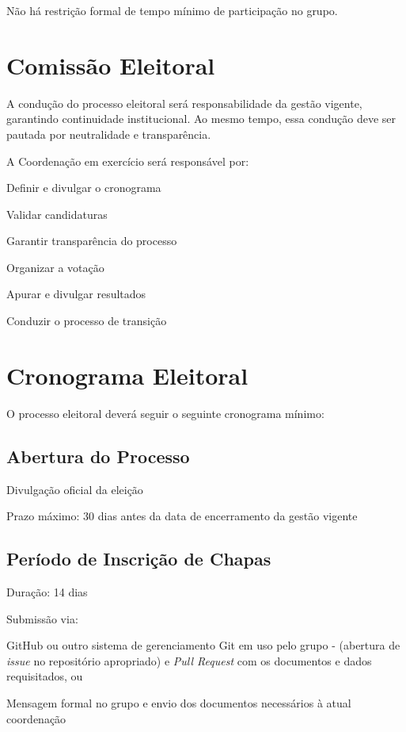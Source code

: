\documentclass[
  12pt,          %
  a4paper,       %
  oneside,       %
  brazil         %
]{article}
\begin{document}
Não há restrição formal de tempo mínimo de participação no grupo.

\section{Comissão Eleitoral}

A condução do processo eleitoral será responsabilidade da gestão vigente, garantindo continuidade institucional. 
Ao mesmo tempo, essa condução deve ser pautada por neutralidade e transparência.

A Coordenação em exercício será responsável por:

\begin{conduta}
	\item Definir e divulgar o cronograma
	\item Validar candidaturas
	\item Garantir transparência do processo
	\item Organizar a votação
	\item Apurar e divulgar resultados
	\item Conduzir o processo de transição
\end{conduta}

\section{Cronograma Eleitoral}

O processo eleitoral deverá seguir o seguinte cronograma mínimo:

\subsection{Abertura do Processo}

\begin{conduta}
	\item Divulgação oficial da eleição
	\item Prazo máximo: 30 dias antes da data de encerramento da gestão vigente
\end{conduta}

\subsection{Período de Inscrição de Chapas}

\begin{conduta}
	\item Duração: 14 dias
	\item Submissão via:
	\begin{conduta}
		\item GitHub ou outro sistema de gerenciamento Git em uso pelo grupo - (abertura de \textit{issue} no repositório apropriado) e \textit{Pull Request} com os documentos e dados requisitados, ou
		\item Mensagem formal no grupo e envio dos documentos necessários à atual coordenação
	\end{conduta}
\end{conduta}
\end{document}
